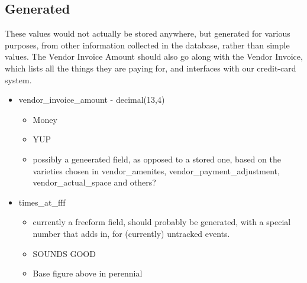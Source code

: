 \documentclass[captions=tablesignature]{scrartcl}
\begin{document}
\subsection{Generated}
\label{sec-2-4}
These values would not actually be stored anywhere, but generated
for various purposes, from other information collected in the
database, rather than simple values.  The Vendor Invoice Amount
should also go along with the Vendor Invoice, which lists all the
things they are paying for, and interfaces with our credit-card
system.
\begin{itemize}
\item vendor\_invoice\_amount - decimal(13,4)
\label{sec-2-4-1}
\begin{itemize}
\item Money
\item YUP
\item possibly a geneerated field, as opposed to a stored one, based
on the varieties chosen in vendor\_amenites,
vendor\_payment\_adjustment, vendor\_actual\_space and others?
\end{itemize}

\item times\_at\_fff
\label{sec-2-4-2}
\begin{itemize}
\item currently a freeform field, should probably be generated, with a
special number that adds in, for (currently) untracked events.
\item SOUNDS GOOD
\item Base figure above in perennial
\end{itemize}
\end{itemize}
\end{document}
